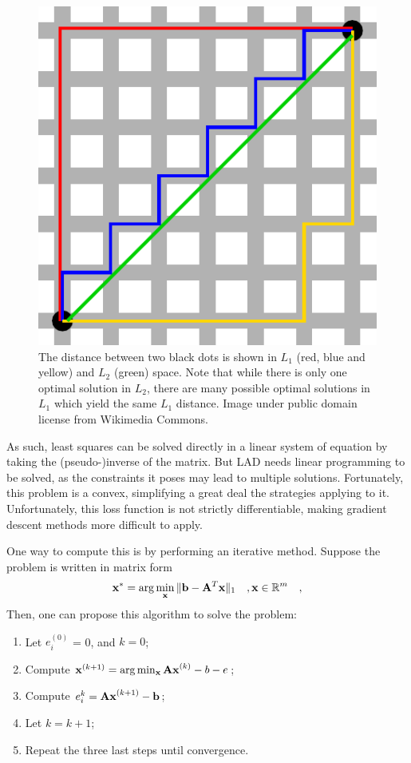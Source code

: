 \documentclass{report}
\begin{document}
\begin{figure}
  \centering
  \includegraphics[width=0.45\linewidth]{q5b_manhattan_distance.pdf}
  \caption[ Examples of $L_1$ and $L_2$ distances ]
   {The distance between two black dots is shown in $L_1$ (red, blue and yellow) and $L_2$ (green) space. Note that while there is only one optimal solution in $L_2$, there are many possible optimal solutions in $L_1$ which yield the same $L_1$ distance. Image under public domain license from Wikimedia Commons.}
   \label{q5b:paths}
\end{figure}

As such, least squares can be solved directly in a linear system of equation by taking the (pseudo-)inverse of the matrix. But LAD needs linear programming to be solved, as the constraints it poses may lead to multiple solutions. Fortunately, this problem is a convex, simplifying a great deal the strategies applying to it. Unfortunately, this loss function is not strictly differentiable, making gradient descent methods more difficult to apply.

One way to compute this is by performing an iterative method. Suppose the problem is written in matrix form
\begin{equation}
\mathbf{x}^* = \arg \min_{\mathbf{x}} \| \mathbf{b} - \mathbf{A}^T\mathbf{x} \|_1 \quad, \mathbf{x} \in \mathbb{R}^m
\quad,
\end{equation}
Then, one can propose this algorithm to solve the problem:
\begin{enumerate}
  \item Let $e_i^{(0)}$ = 0, and $k = 0$;
  \item Compute $\mathbf{x}^{(k+1)} = \arg \min_{\mathbf{x}} \mathbf{Ax}^{(k)} - b - e$;
  \item Compute $e_i^{k} = \mathbf{Ax}^{(k+1)} - \mathbf{b}$;
  \item Let $k = k + 1$;
  \item Repeat the three last steps until convergence.
\end{enumerate}
\end{document}
